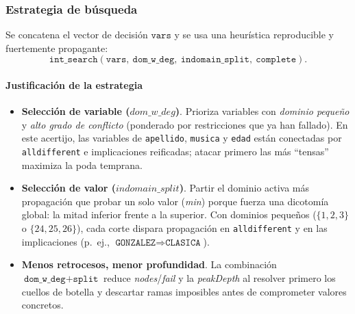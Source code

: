 \subsubsection*{Estrategia de búsqueda}
Se concatena el vector de decisión \(\texttt{vars}\) y se usa una heurística reproducible y fuertemente propagante:
\[
\texttt{int\_search}(\texttt{vars},\ \texttt{dom\_w\_deg},\ \texttt{indomain\_split},\ \texttt{complete}).
\]
\paragraph{Justificación de la estrategia}
\begin{itemize}
  \item \textbf{Selección de variable (\(dom\_w\_deg\))}. Prioriza variables con \emph{dominio pequeño} y \emph{alto grado de conflicto} (ponderado por restricciones que ya han fallado). En este acertijo, las variables de \texttt{apellido}, \texttt{musica} y \texttt{edad} están conectadas por \texttt{alldifferent} e implicaciones reificadas; atacar primero las más “tensas” maximiza la poda temprana.
  \item \textbf{Selección de valor (\(indomain\_split\))}. Partir el dominio activa más propagación que probar un solo valor (\emph{min}) porque fuerza una dicotomía global: la mitad inferior frente a la superior. Con dominios pequeños (\(\{1,2,3\}\) o \(\{24,25,26\}\)), cada corte dispara propagación en \texttt{alldifferent} y en las implicaciones (p.~ej., \(\texttt{GONZALEZ}\Rightarrow\texttt{CLASICA}\)).
  \item \textbf{Menos retrocesos, menor profundidad}. La combinación \(\texttt{dom\_w\_deg}+\texttt{split}\) reduce \textit{nodes}/\textit{fail} y la \textit{peakDepth} al resolver primero los cuellos de botella y descartar ramas imposibles antes de comprometer valores concretos.
\end{itemize}